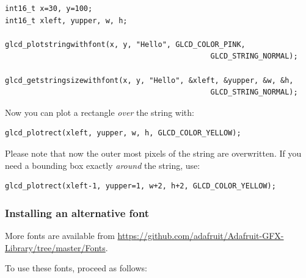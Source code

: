 \documentclass[12pt]{article}
\begin{document}
\begin{lstlisting}
int16_t x=30, y=100;
int16_t xleft, yupper, w, h;

glcd_plotstringwithfont(x, y, "Hello", GLCD_COLOR_PINK,
                                               GLCD_STRING_NORMAL);

glcd_getstringsizewithfont(x, y, "Hello", &xleft, &yupper, &w, &h,
                                               GLCD_STRING_NORMAL);
\end{lstlisting}

Now you can plot a rectangle \textsl{over} the string with:

\begin{lstlisting}
glcd_plotrect(xleft, yupper, w, h, GLCD_COLOR_YELLOW);
\end{lstlisting}

Please note that now the outer most pixels of the string are overwritten. If you need a bounding box exactly \textsl{around} the string, use:

\begin{lstlisting}
glcd_plotrect(xleft-1, yupper=1, w+2, h+2, GLCD_COLOR_YELLOW);
\end{lstlisting}


\subsubsection{Installing an alternative font}
More fonts are available from \url{https://github.com/adafruit/Adafruit-GFX-Library/tree/master/Fonts}.

To use these fonts, proceed as follows:
\end{document}

